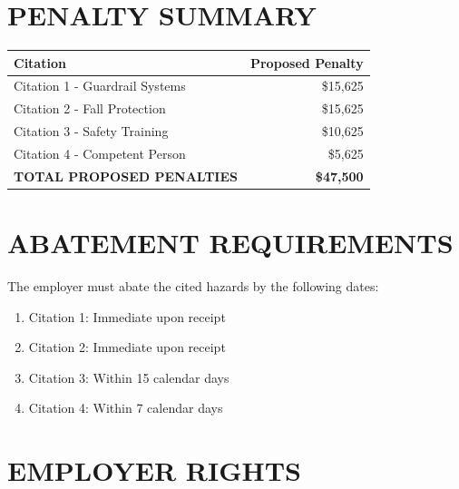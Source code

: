 \documentclass[11pt]{article}
\begin{document}
\vspace{1em}

\noindent{}

\vspace{1.5em}

\section*{PENALTY SUMMARY}

\begin{tabular}{@{}lr@{}}
\toprule
\textbf{Citation} & \textbf{Proposed Penalty} \\
\midrule
Citation 1 - Guardrail Systems & \$15,625 \\
Citation 2 - Fall Protection & \$15,625 \\
Citation 3 - Safety Training & \$10,625 \\
Citation 4 - Competent Person & \$5,625 \\
\midrule
\textbf{TOTAL PROPOSED PENALTIES} & \textbf{\$47,500} \\
\bottomrule
\end{tabular}

\section*{ABATEMENT REQUIREMENTS}

The employer must abate the cited hazards by the following dates:

\begin{enumerate}
\item Citation 1: Immediate upon receipt
\item Citation 2: Immediate upon receipt
\item Citation 3: Within 15 calendar days
\item Citation 4: Within 7 calendar days
\end{enumerate}

\section*{EMPLOYER RIGHTS}
\end{document}
